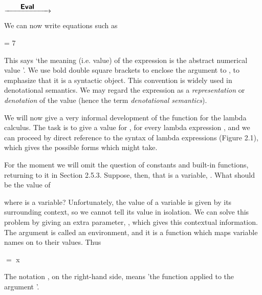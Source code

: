 \begin{center}
         $\xrightarrow{\qquad\text{\normalsize {\sffamily \bfseries Eval}{}}\qquad}$ 
\end{center}

We can now write equations such as
\begin{mlcoded}
     = 7
\end{mlcoded}
This says `the meaning (i.e. value) of the expression  is the abstract
numerical value '. We use bold double square brackets to enclose the
argument to \eval{}, to emphasize that it is a syntactic object. This convention is
widely used in denotational semantics. We may regard the expression 
as a \textit{representation} or \textit{denotation} of the value  (hence the term \textit{denotational semantics}).

We will now give a very informal development of the \eval{} function for the
lambda calculus. The task is to give a value for , for every lambda
expression , and we can proceed by direct reference to the syntax of lambda
expressions (Figure 2.1), which gives the possible forms which  might take.

For the moment we will omit the question of constants and built-in
functions, returning to it in Section 2.5.3. Suppose, then, that  is a variable,
. What should be the value of
\begin{mlcoded}
\end{mlcoded}
where  is a variable? Unfortunately, the value of a variable is given by its
surrounding context, so we cannot tell its value in isolation. We can solve this
problem by giving \eval{} an extra parameter, \tr{}, which gives this contextual
information. The argument \tr{} is called an environment, and it is a function
which maps variable names on to their values. Thus
\begin{mlcoded}
     \tr{} $=$ \tr{} x
\end{mlcoded}


The notation , on the right-hand side, means 'the function \ml{(\tr{})} applied to
the argument '.

